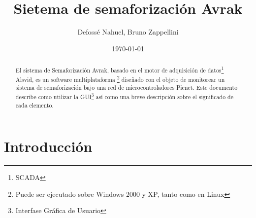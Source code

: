 \documentclass[11pt,a4paper]{report}
\begin{document}
\title{Sietema de semaforización Avrak}
\author{Defossé Nahuel, Bruno Zappellini}
\date{\today}

\maketitle

\tableofcontents

\begin{abstract}
El sistema de Semaforización Avrak, basado en el motor de adquisición de
datos\footnote{SCADA} Alsvid, es un software multiplataforma
\footnote{Puede ser ejecutado sobre Windows 2000 y XP, tanto como en Linux}
diseñado con el objeto de monitorear un sistema de semaforización bajo una 
red de microcontroladores Picnet.
Este documento describe como utilizar la GUI\footnote{Interfase Gráfica de
Usuario} así como una breve descripción sobre el significado de cada elemento.
\end{abstract}

\chapter{Introducción}
\label{ch:intro}
\end{document}
